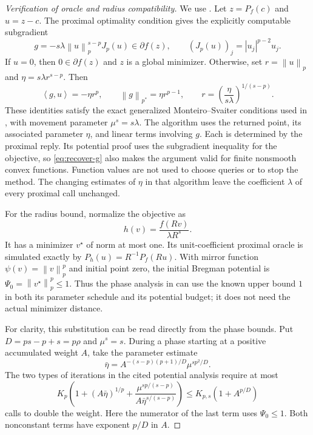 \documentclass[11pt]{article}
\theoremstyle{definition}
\theoremstyle{remark}
\newcommand{\norm}[1]{\left\lVert#1\right\rVert}
\newcommand{\ip}[2]{\left\langle#1,#2\right\rangle}
\begin{document}
\begin{proof}[Verification of oracle and radius compatibility]
We use \citet[Theorems~4 and~14, Algorithm~2, and Appendix~C]{ABJS}.
Let $z=P_f(c)$ and $u=z-c$. The proximal optimality condition gives
the explicitly computable subgradient
\begin{equation}\label{eq:recover-g}
g=-s\lambda\norm{u}_p^{s-p}J_p(u)\in\partial f(z),
\qquad
(J_p(u))_j=|u_j|^{p-2}u_j.
\end{equation}
If $u=0$, then $0\in\partial f(z)$ and $z$ is a global minimizer.
Otherwise, set $r=\norm{u}_p$ and $\eta=s\lambda r^{s-p}$. Then
\begin{equation}\label{eq:gms}
\ip{g}{u}=-\eta r^p,
\qquad
\norm{g}_{p^*}=\eta r^{p-1},
\qquad
r=\left(\frac{\eta}{s\lambda}\right)^{1/(s-p)}.
\end{equation}
These identities satisfy the exact generalized Monteiro--Svaiter
conditions used in \citet[Lemma~39]{ABJS}, with movement parameter
$\mu^s=s\lambda$. The algorithm uses the returned point, its associated
parameter $\eta$, and linear terms involving $g$. Each is determined
by the proximal reply. Its potential proof uses the subgradient
inequality for the objective, so \eqref{eq:recover-g} also makes the
argument valid for finite nonsmooth convex functions. Function values
are not used to choose queries or to stop the method. The changing
estimates of $\eta$ in that algorithm leave the coefficient $\lambda$
of every proximal call unchanged.

For the radius bound, normalize the objective as
\begin{equation}\label{eq:normalization}
h(v)=\frac{f(Rv)}{\lambda R^s}.
\end{equation}
It has a minimizer $v^\star$ of norm at most one. Its unit-coefficient
proximal oracle is simulated exactly by
$P_h(u)=R^{-1}P_f(Ru)$. With mirror function
$\psi(v)=\norm{v}_p^p$ and initial point zero, the initial Bregman
potential is $\Psi_0=\norm{v^\star}_p^p\le1$.
Thus the phase analysis in \citet[Appendix~C.3]{ABJS} can use the
known upper bound $1$ in both its parameter schedule and its potential
budget; it does not need the actual minimizer distance.

For clarity, this substitution can be read directly from the phase
bounds. Put $D=ps-p+s=p\rho$ and $\mu^s=s$. During a phase starting
at a positive accumulated weight $A$, take the parameter estimate
\begin{equation}\label{eq:phase-parameter}
\bar\eta=A^{-(s-p)(p+1)/D}\mu^{sp^2/D}.
\end{equation}
The two types of iterations in the cited potential analysis require at
most
\begin{equation}\label{eq:phase-count}
K_p\left(1+(A\bar\eta)^{1/p}
+\frac{\mu^{sp/(s-p)}}{A\bar\eta^{s/(s-p)}}\right)
\le K_{p,s}(1+A^{p/D})
\end{equation}
calls to double the weight. Here the numerator of the last term uses
$\Psi_0\le1$. Both nonconstant terms have exponent $p/D$ in $A$.


\end{proof}
\end{document}
